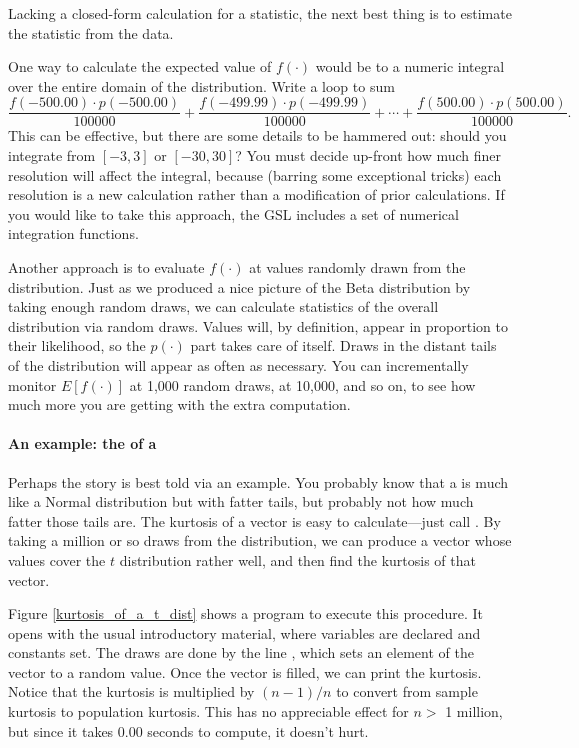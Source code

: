 Lacking a closed-form calculation for a statistic, the next best thing
is to estimate the statistic from the data. 

One way to calculate the expected value of $f(\cdot)$ would be to a numeric
integral over the entire domain of the distribution. Write a loop to
sum $$\frac{f(-500.00)\cdot p(-500.00)}{100000} + \frac{f(-499.99)\cdot
p(-499.99)}{100000} + \cdots + \frac{f(500.00)\cdot p(500.00)}{100000}.$$ This can be effective, but there are
some details to be hammered out: should you integrate from $[-3,3]$
or $[-30,30]$? You must decide up-front how much finer resolution will
affect the integral, because (barring some exceptional tricks) each
resolution is a new calculation rather than a modification of prior 
calculations. If you would like to take this approach, the GSL includes
a set of numerical integration functions.

Another approach is to evaluate $f(\cdot)$ at values randomly drawn
from the distribution.  Just as we produced a nice picture of the
Beta distribution by taking enough random draws, we can calculate
statistics of the overall distribution via random draws.  Values will,
by definition, appear in proportion to their likelihood, so the $p(\cdot)$
part takes care of itself. Draws in the distant tails of the distribution
will appear as often as necessary.  You can incrementally monitor
$E[f(\cdot)]$ at 1,000 random draws, at 10,000, and so on, to see how
much more you are getting with the extra computation.


\paragraph{An example: the  of a }\label{tkurt} 
Perhaps the
story is best told via an example.  You probably
know that a  is much like a Normal distribution but
with fatter tails, but probably not how much fatter those tails are.
The kurtosis of a vector is easy to calculate---just call
. By taking a million or so draws from the
distribution, we can produce a vector whose values cover the $t$
distribution rather well, and then find the kurtosis of that vector.

Figure \ref{kurtosis_of_a_t_dist} shows a program to execute this procedure. 
It opens with the usual introductory material, where variables are
declared and constants set. The draws are done by the line
, which sets an
element of the vector  to a random value. Once the vector is
filled, we can print the kurtosis. Notice that the kurtosis is
multiplied by $(n-1)/n$ to convert from sample kurtosis to population 
kurtosis. This has no appreciable effect for $n >$ 1 million, but since it takes
0.00 seconds to compute, it doesn't hurt.

